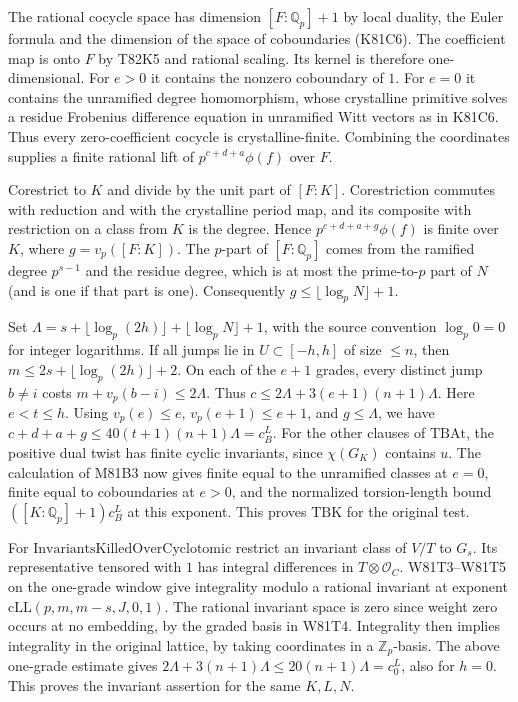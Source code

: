The rational cocycle space has dimension $[F:\mathbb Q_p]+1$ by
local duality, the Euler formula and the dimension of the space of
coboundaries (K81C6). The coefficient map is onto $F$ by T82K5
and rational scaling. Its kernel is therefore one-dimensional. For
$e>0$ it contains the nonzero coboundary of $1$. For $e=0$ it
contains the unramified degree homomorphism, whose crystalline
primitive solves a residue Frobenius difference equation in
unramified Witt vectors as in K81C6. Thus every zero-coefficient
cocycle is crystalline-finite. Combining the coordinates supplies
a finite rational lift of $p^{c+d+a}\phi(f)$ over $F$.

Corestrict to $K$ and divide by the unit part of $[F:K]$.
Corestriction commutes with reduction and with the crystalline
period map, and its composite with restriction on a class from $K$
is the degree. Hence $p^{c+d+a+g}\phi(f)$ is finite over $K$,
where $g=v_p([F:K])$. The $p$-part of $[F:\mathbb Q_p]$ comes
from the ramified degree $p^{s-1}$ and the residue degree, which is
at most the prime-to-$p$ part of $N$ (and is one if that part is one).
Consequently $g\le\lfloor\log_p N\rfloor+1$.

Set $\Lambda=s+\lfloor\log_p(2h)\rfloor+\lfloor\log_p N\rfloor+1$,
with the source convention $\log_p0=0$ for integer logarithms.
If all jumps lie in $U\subset[-h,h]$ of size $\le n$, then
$m\le2s+\lfloor\log_p(2h)\rfloor+2$. On each of the $e+1$
grades, every distinct jump $b\ne i$ costs
$m+v_p(b-i)\le2\Lambda$. Thus
$c\le2\Lambda+3(e+1)(n+1)\Lambda$. Here $e<t\le h$.
Using $v_p(e)\le e$, $v_p(e+1)\le e+1$, and $g\le\Lambda$,
we have $c+d+a+g\le40(t+1)(n+1)\Lambda=c_B^L$.
For the other clauses of $\mathrm{TBAt}$, the positive dual
twist has finite cyclic invariants, since $\chi(G_K)$ contains
$u$. The calculation of M81B3 now gives finite equal to the
unramified classes at $e=0$, finite equal to coboundaries at
$e>0$, and the normalized torsion-length bound
$([K:\mathbb Q_p]+1)c_B^L$ at this exponent. This proves
$\mathrm{TBK}$ for the original test.

For $\mathrm{InvariantsKilledOverCyclotomic}$ restrict an invariant
class of $V/T$ to $G_s$. Its representative tensored with $1$ has
integral differences in $T\otimes\mathcal O_C$. W81T3--W81T5 on
the one-grade window give integrality modulo a rational invariant at
exponent $\mathrm{cLL}(p,m,m-s,J,0,1)$. The rational invariant
space is zero since weight zero occurs at no embedding, by the
graded basis in W81T4. Integrality then implies integrality in the
original lattice, by taking coordinates in a $\mathbb Z_p$-basis.
The above one-grade estimate gives
$2\Lambda+3(n+1)\Lambda\le20(n+1)\Lambda=c_0^L$, also for $h=0$.
This proves the invariant assertion for the same $K,L,N$.
